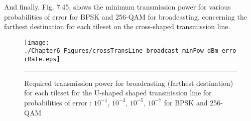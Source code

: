 And finally, Fig. 7.45, shows the minimum transmission power for various probabilities of error for BPSK and 256-QAM for broadcasting, concerning the farthest destination for each tileset on the cross-shaped transmission line. 

\begin{figure}[htbp]
  \centering
    \texttt{[image: ./Chapter6\_Figures/crossTransLine\_broadcast\_minPow\_dBm\_errorRate.eps]}
    \rule{35em}{0.5pt}
  \caption[Required transmission power for broadcasting (farthest destination) for each tileset for the U-shaped shaped transmission line for probabilities of error : $10^{-1}$, $10^{-3}$, $10^{-5}$, $10^{-7}$ for BPSK and 256-QAM]{Required transmission power for broadcasting (farthest destination) for each tileset for the U-shaped shaped transmission line for probabilities of error : $10^{-1}$, $10^{-3}$, $10^{-5}$, $10^{-7}$ for BPSK and 256-QAM}
  \label{fig:Electron}
\end{figure}



